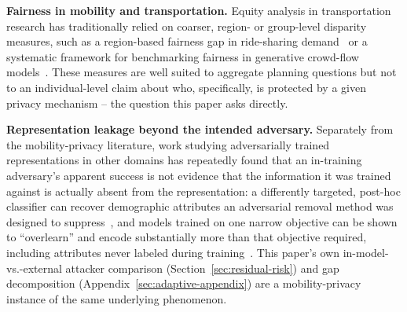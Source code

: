 \textbf{Fairness in mobility and transportation.} Equity analysis in
transportation research has traditionally relied on coarser,
region- or group-level disparity measures, such as a region-based
fairness gap in ride-sharing
demand~\cite{yan2020fairness,yan2019fairst} or a systematic framework
for benchmarking fairness in generative crowd-flow
models~\cite{he2025framework}. These measures are well suited to
aggregate planning questions but not to an individual-level claim
about who, specifically, is protected by a given privacy mechanism --
the question this paper asks directly.

\textbf{Representation leakage beyond the intended adversary.} Separately
from the mobility-privacy literature, work studying adversarially
trained representations in other domains has repeatedly found that an
in-training adversary's apparent success is not evidence that the
information it was trained against is actually absent from the
representation: a differently targeted, post-hoc classifier can
recover demographic attributes an adversarial removal method was
designed to suppress~\cite{elazar2018adversarial}, and models trained
on one narrow objective can be shown to ``overlearn'' and encode
substantially more than that objective required, including attributes
never labeled during
training~\cite{song2020overlearning}. This paper's own in-model-vs.-external
attacker comparison (Section~\ref{sec:residual-risk}) and gap
decomposition (Appendix~\ref{sec:adaptive-appendix}) are a mobility-privacy
instance of the same underlying phenomenon.
